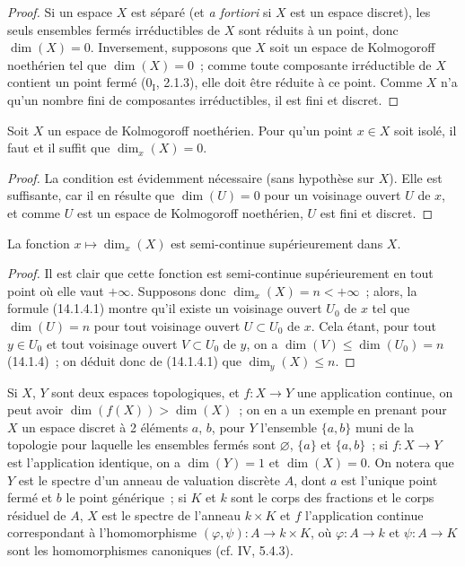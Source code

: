 \begin{proof}
Si un espace $X$ est séparé (et \emph{a fortiori} si $X$ est un espace
discret), les seuls ensembles fermés irréductibles de $X$ sont réduits à un
point, donc $\dim(X)=0$. Inversement, supposons que $X$ soit un espace de
Kolmogoroff noethérien tel que $\dim(X)=0$~; comme toute composante
irréductible de $X$ contient un point fermé ($0_{\mathrm I}$, 2.1.3), elle
doit être réduite à ce point. Comme $X$ n'a qu'un nombre fini de composantes
irréductibles, il est fini et discret.
\end{proof}

\begin{corollary}[14.1.10]
\label{0.14.1.10-fr}
Soit $X$ un espace de Kolmogoroff noethérien. Pour qu'un point $x\in X$ soit
isolé, il faut et il suffit que $\dim_x(X)=0$.
\end{corollary}

\begin{proof}
La condition est évidemment nécessaire (sans hypothèse sur $X$). Elle est
suffisante,
car il en résulte que $\dim(U)=0$ pour un voisinage ouvert $U$ de $x$, et
comme $U$ est un espace de Kolmogoroff noethérien, $U$ est fini et discret.
\end{proof}

\begin{proposition}[14.1.11]
\label{0.14.1.11-fr}
La fonction $x\mapsto\dim_x(X)$ est semi-continue supérieurement dans $X$.
\end{proposition}

\begin{proof}
Il est clair que cette fonction est semi-continue supérieurement en tout
point où elle vaut $+\infty$. Supposons donc $\dim_x(X)=n<+\infty$~; alors,
la formule (14.1.4.1) montre qu'il existe un voisinage ouvert $U_0$ de $x$ tel
que $\dim(U)=n$ pour tout voisinage ouvert $U\subset U_0$ de $x$. Cela étant,
pour tout $y\in U_0$ et tout voisinage ouvert $V\subset U_0$ de $y$, on a
$\dim(V)\leq\dim(U_0)=n$ (14.1.4)~; on déduit donc de (14.1.4.1) que
$\dim_y(X)\leq n$.
\end{proof}

\begin{remark}[14.1.12]
\label{0.14.1.12-fr}
Si $X$, $Y$ sont deux espaces topologiques, et $f:X\to Y$ une application
continue, on peut avoir $\dim(f(X))>\dim(X)$~; on en a un exemple en prenant
pour $X$ un espace discret à 2 éléments $a$, $b$, pour $Y$ l'ensemble
$\{a,b\}$ muni de la topologie pour laquelle les ensembles fermés sont
$\varnothing$, $\{a\}$ et $\{a,b\}$~; si $f:X\to Y$ est l'application
identique, on a $\dim(Y)=1$ et $\dim(X)=0$. On notera que $Y$ est le spectre
d'un anneau de valuation discrète $A$, dont $a$ est l'unique point fermé et
$b$ le point générique~; si $K$ et $k$ sont le corps des fractions et le
corps résiduel de $A$, $X$ est le spectre de l'anneau $k\times K$ et $f$
l'application continue correspondant à l'homomorphisme
$(\varphi,\psi):A\to k\times K$, où $\varphi:A\to k$ et $\psi:A\to K$ sont
les homomorphismes canoniques (cf. IV, 5.4.3).
\end{remark}


